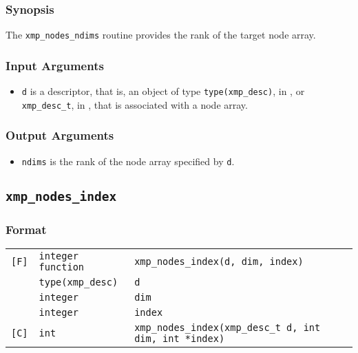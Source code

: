\subsubsection*{Synopsis}

The {\tt xmp\_nodes\_ndims} routine provides the rank of the target node
array.

\subsubsection*{Input Arguments}
\begin{itemize}
 \item {\tt d} is a descriptor, that is, an object of type 
       {\tt type(xmp\_desc)}, in {\XMPF}, or {\tt xmp\_desc\_t},
       in {\XMPC}, that is associated with a node array.
\end{itemize}

\subsubsection*{Output Arguments}
\begin{itemize}
 \item {\tt ndims} is the rank of the node array specified by {\tt d}.
\end{itemize}


\subsection{\tt xmp\_nodes\_index}

\subsubsection*{Format}

\begin{tabular}{lll}

\verb![F]!& {\tt integer function}& {\tt xmp\_nodes\_index(d, dim, index)}\\
          & {\tt type(xmp\_desc)} & {\tt d}\\
          & {\tt integer} & {\tt dim}\\
          & {\tt integer} & {\tt index}\\

\verb![C]!&  {\tt int}& {\tt xmp\_nodes\_index(xmp\_desc\_t d, int dim, int *index)}\\

\end{tabular}

